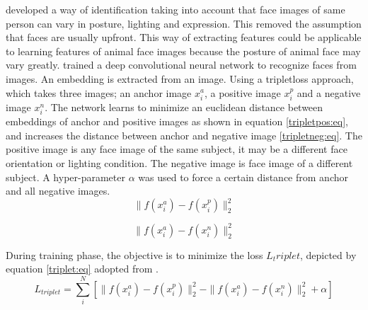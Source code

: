  \citeauthor{schroff2015facenet} \citeyear{schroff2015facenet} \cite{schroff2015facenet} developed a way of identification taking into account that face images of same person can vary in posture, lighting and expression. This removed the assumption that faces are usually upfront. This way of extracting features could be applicable to learning  features of animal face images because the posture of animal face may vary greatly. \citeauthor{schroff2015facenet} \citeyear{schroff2015facenet} \cite{schroff2015facenet} trained a deep convolutional neural network to recognize faces from images. An embedding is extracted from an image. Using a tripletloss approach, which takes three images; an anchor image $x_{i}^a$, a positive image $x_{i}^p$ and a negative image $x_{i}^n$. The network learns to minimize an euclidean distance between embeddings of anchor and positive images as shown in equation \ref{tripletpos:eq}, and increases the distance between anchor and negative image \ref{tripletneg:eq}. The positive image is any face image of the same subject, it may be a different face orientation or lighting condition. The negative image is face image of a different subject. A hyper-parameter $\alpha$ was used to force a certain distance from anchor and all negative images. 
 \begin{equation}\label{tripletpos:eq}
     \parallel f(x_{i}^a)-f(x_{i}^p)\parallel^2_2
 \end{equation}
 
 \begin{equation}\label{tripletneg:eq}
     \parallel f(x_{i}^a)-f(x_{i}^n)\parallel^2_2
 \end{equation}
 
 During training phase, the objective is to minimize the loss $L_triplet$, depicted by equation \ref{triplet:eq} adopted from \cite{schroff2015facenet}.     
 \begin{equation}\label{triplet:eq}
     L_{triplet} = \sum_{i}^N[\parallel f(x_{i}^a)-f(x_{i}^p)\parallel_{2}^2-\parallel f(x_{i}^a)-f(x_{i}^n)\parallel^2_2+\alpha] 
 \end{equation}
 
